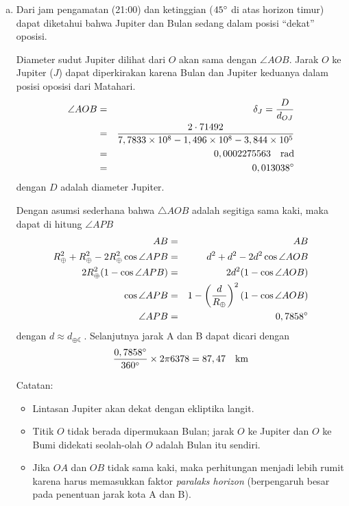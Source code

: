 \documentclass[11pt,fleqn, a4paper]{exam}
\begin{document}
\begin{questions}
\begin{enumerate}[(a)]
\item Dari jam pengamatan (21:00) dan ketinggian ($45\degree$ di atas horizon timur) dapat diketahui bahwa Jupiter dan Bulan sedang dalam posisi ``dekat'' oposisi.

Diameter sudut Jupiter dilihat dari $O$ akan sama dengan $\angle AOB$. Jarak $O$ ke Jupiter ($J$) dapat diperkirakan karena Bulan dan Jupiter keduanya dalam posisi oposisi dari Matahari.
\begin{eqnarray*}
\angle AOB &=& \delta_J = \frac{D}{d_{OJ}}\\ 
&=& \frac{2 \cdot 71492}{7,7833 \times 10^{8} - 1,496 \times 10^{8} - 3,844 \times 10^{5}}\\
&=& 0,0002275563 \quad \text{rad}\\
&=& 0,013038 \degree
\end{eqnarray*}
dengan $D$ adalah diameter Jupiter.

Dengan asumsi sederhana bahwa $\triangle AOB$ adalah segitiga sama kaki, maka dapat di hitung $\angle APB$
\begin{eqnarray*}
AB &=& AB\\
R_{\oplus}^{2} + R_{\oplus}^{2} - 2R_{\oplus}^{2}\cos{\angle APB} &=& d^{2} + d^{2} - 2d^{2}\cos{\angle AOB} \\
2R_{\oplus}^{2} (1 - \cos \angle APB) &=& 2d^{2} (1 - \cos \angle AOB)\\
\cos \angle APB &=& 1 - \left(\frac{d}{R_{\oplus}}\right)^{2} (1 - \cos{\angle AOB})\\
\angle APB &=& 0,7858\degree
\end{eqnarray*}
dengan $d \approx d_{\oplus\leftmoon}$. Selanjutnya jarak A dan B dapat dicari dengan
\begin{eqnarray*}
\frac{0,7858\degree}{360\degree} \times 2 \pi 6378 = 87,47 \quad \text{km}
\end{eqnarray*}

Catatan:
\begin{itemize}
\item Lintasan Jupiter akan dekat dengan ekliptika langit.
\item Titik $O$ tidak berada dipermukaan Bulan; jarak $O$ ke Jupiter dan $O$ ke Bumi didekati seolah-olah $O$ adalah Bulan itu sendiri.
\item Jika $OA$ dan $OB$ tidak sama kaki, maka perhitungan menjadi lebih rumit karena harus memasukkan faktor \textit{paralaks horizon} (berpengaruh besar pada penentuan jarak kota A dan B).
\end{itemize}

\end{enumerate}

\end{questions}
\end{document}
